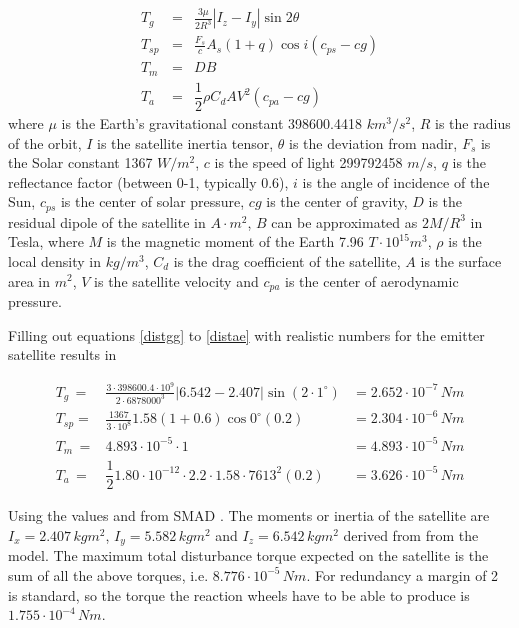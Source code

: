 \begin{eqnarray}
T_g \,&=& \frac{3\mu}{2R^3} \left|I_z - I_y \right| \sin{2\theta} \label{distgg} \\
T_{sp} &=& \frac{F_s}{c}A_s\left(1+q\right)\cos{i}\left(c_{ps}-cg\right) \label{distsr} \\
T_m \,&=& DB \label{distmf} \\
T_a \,&=& \dfrac{1}{2}\rho C_dAV^2 \left(c_{pa} -cg\right) \label{distae}
\end{eqnarray}
where $\mu$ is the Earth's gravitational constant 398600.4418 $km^3/s^2$, $R$ is the radius of the orbit, $I$ is the satellite inertia tensor, $\theta$ is the deviation from nadir, $F_s$ is the Solar constant 1367 $W/m^2$, $c$ is the speed of light 299792458 $m/s$, $q$ is the reflectance factor (between 0-1, typically 0.6), $i$ is the angle of incidence of the Sun, $c_{ps}$ is the center of solar pressure, $cg$ is the center of gravity, $D$ is the residual dipole of the satellite in $A\cdot m^2$, $B$ can be approximated as $2M/R^3$ in Tesla, where $M$ is the magnetic moment of the Earth 7.96 $T\cdot 10^{15} m^3$, $\rho$ is the local density in $kg/m^3$, $C_d$ is the drag coefficient of the satellite, $A$ is the surface area in $m^2$, $V$ is the satellite velocity and $c_{pa}$ is the center of aerodynamic pressure.

Filling out equations \ref{distgg} to \ref{distae} with realistic numbers for the emitter satellite results in

\begin{eqnarray*}
T_g \,=& \frac{3\cdot 398600.4\cdot 10^9}{2\cdot 6878000^3} \left| 6.542 - 2.407 \right| \sin{\left(2\cdot 1^\circ \right)} &= 2.652\cdot 10^{-7}\,Nm\\
T_{sp} =& \frac{1367}{3\cdot 10^8}1.58\left(1+0.6\right)\cos{0^\circ}\left(0.2\right) &= 2.304 \cdot 10^{-6}\,Nm\\
T_m \,=& 4.893\cdot 10^{-5} \cdot 1  &= 4.893\cdot 10^{-5}\,Nm\\
T_a \,=& \dfrac{1}{2} 1.80 \cdot 10^{-12}\cdot 2.2\cdot 1.58 \cdot 7613^2 \left(0.2\right) &= 3.626 \cdot 10^{-5}\,Nm
\end{eqnarray*}

Using the values and from SMAD \cite{larson}. The moments or inertia of the satellite are $I_x = 2.407\,kgm^2$,  $I_y = 5.582\,kgm^2$ and $I_z = 6.542\,kgm^2$ derived from  from the model. The maximum total disturbance torque expected on the satellite is the sum of all the above torques, i.e. $8.776 \cdot 10^{-5}\,Nm$. For redundancy a margin of 2 is standard, so the torque the reaction wheels have to be able to produce is $1.755\cdot 10^{-4}\,Nm$.

